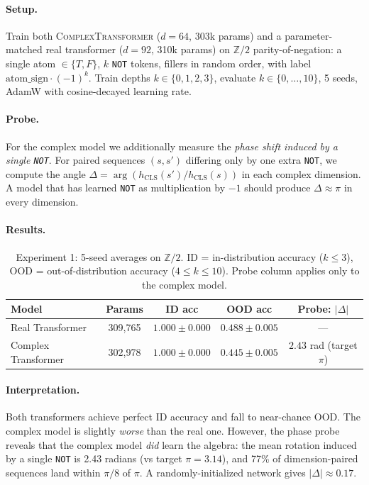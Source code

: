 \documentclass[11pt]{article}
\theoremstyle{definition}
\newcommand{\Z}{\mathbb{Z}}
\begin{document}
\paragraph{Setup.} Train both \textsc{ComplexTransformer} ($d=64$,
303k params) and a parameter-matched real transformer ($d=92$, 310k
params) on $\Z/2$ parity-of-negation: a single atom $\in \{T, F\}$,
$k$ \texttt{NOT} tokens, fillers in random order, with label
$\mathrm{atom\_sign} \cdot (-1)^k$. Train depths $k \in \{0,1,2,3\}$,
evaluate $k \in \{0, \ldots, 10\}$, 5 seeds, AdamW with
cosine-decayed learning rate.

\paragraph{Probe.} For the complex model we additionally measure the
\emph{phase shift induced by a single \texttt{NOT}}. For paired
sequences $(s, s')$ differing only by one extra \texttt{NOT}, we
compute the angle $\Delta = \arg(h_\mathrm{CLS}(s') / h_\mathrm{CLS}(s))$
in each complex dimension. A model that has learned \texttt{NOT}
as multiplication by $-1$ should produce $\Delta \approx \pi$ in
every dimension.

\paragraph{Results.}

\begin{table}[h]
\centering
\caption{Experiment 1: 5-seed averages on $\Z/2$. ID = in-distribution
accuracy ($k \leq 3$), OOD = out-of-distribution accuracy
($4 \leq k \leq 10$). Probe column applies only to the complex model.}
\label{tab:exp1-results}
\begin{tabular}{lcccc}
\toprule
Model & Params & ID acc & OOD acc & Probe: $|\Delta|$ \\
\midrule
Real Transformer    & 309{,}765 & $1.000 \pm 0.000$ & $0.488 \pm 0.005$ & ---  \\
Complex Transformer & 302{,}978 & $1.000 \pm 0.000$ & $0.445 \pm 0.005$ & $2.43$ rad (target $\pi$) \\
\bottomrule
\end{tabular}
\end{table}

\paragraph{Interpretation.} Both transformers achieve perfect ID
accuracy and fall to near-chance OOD. The complex model is
slightly \emph{worse} than the real one. However, the phase probe
reveals that the complex model \emph{did} learn the algebra: the
mean rotation induced by a single \texttt{NOT} is 2.43 radians (vs
target $\pi = 3.14$), and 77\% of dimension-paired sequences land
within $\pi/8$ of $\pi$. A randomly-initialized network gives
$|\Delta| \approx 0.17$.
\end{document}
